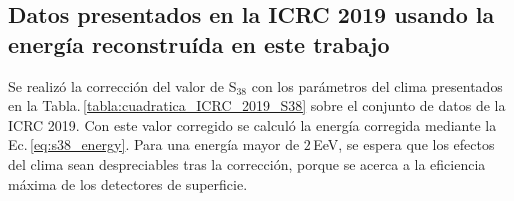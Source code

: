 

\subsection{Datos presentados en la ICRC 2019 usando la energía reconstruída en este trabajo}

Se realizó la corrección del valor de S$_{38}$ con los parámetros del clima presentados en la Tabla.\,\ref{tabla:cuadratica_ICRC_2019_S38} sobre el conjunto de datos de la ICRC 2019. Con este valor corregido se calculó la energía corregida mediante la Ec.\,\ref{eq:s38_energy}. Para una energía mayor de $2\,$EeV, se espera que los efectos del clima sean despreciables tras la corrección, porque se acerca a la eficiencia máxima de los detectores de superficie. %

